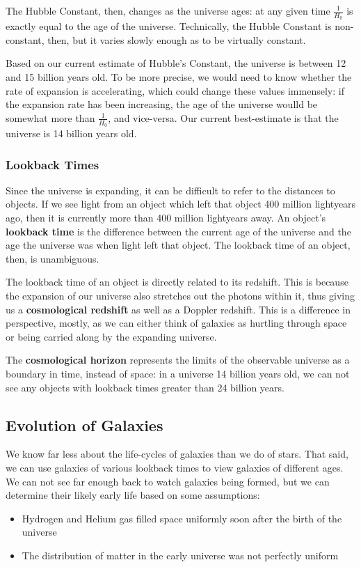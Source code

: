 \documentclass[12pt]{article}
\begin{document}
The Hubble Constant, then, changes as the universe ages: at any given time $\frac{1}{H_0}$ is exactly equal to the age of the universe. Technically, the Hubble Constant is non-constant, then, but it varies slowly enough as to be virtually constant.

Based on our current estimate of Hubble's Constant, the universe is between 12 and 15 billion years old. To be more precise, we would need to know whether the rate of expansion is accelerating, which could change these values immensely: if the expansion rate has been increasing, the age of the universe woulld be somewhat more than $\frac{1}{H_0}$, and vice-versa. Our current best-estimate is that the universe is 14 billion years old.

\subsubsection{Lookback Times}
Since the universe is expanding, it can be difficult to refer to the distances to objects. If we see light from an object which left that object 400 million lightyears ago, then it is currently more than 400 million lightyears away. An object's {\bf lookback time} is the difference between the current age of the universe and the age the universe was when light left that object. The lookback time of an object, then, is unambiguous.

The lookback time of an object is directly related to its redshift. This is because the expansion of our universe also stretches out the photons within it, thus giving us a {\bf cosmological redshift} as well as a Doppler redshift. This is a difference in perspective, mostly, as we can either think of galaxies as hurtling through space or being carried along by the expanding universe.

The {\bf cosmological horizon} represents the limits of the observable universe as a boundary in time, instead of space: in a universe 14 billion years old, we can not see any objects with lookback times greater than 24 billion years.

\subsection{Evolution of Galaxies}
We know far less about the life-cycles of galaxies than we do of stars. That said, we can use galaxies of various lookback times to view galaxies of different ages. We can not see far enough back to watch galaxies being formed, but we can determine their likely early life based on some assumptions:
\begin{itemize}
\item Hydrogen and Helium gas filled space uniformly soon after the birth of the universe
\item The distribution of matter in the early universe was not perfectly uniform
\end{itemize}
\end{document}
